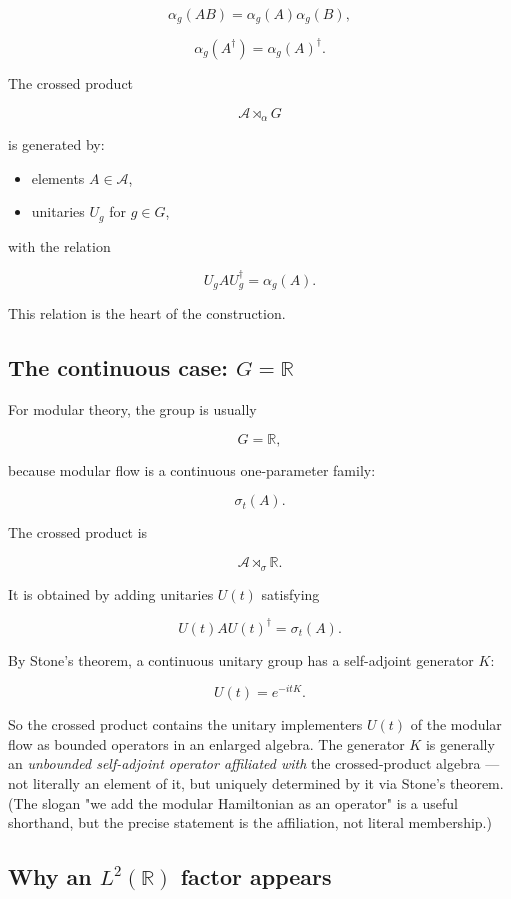 \documentclass[11pt,a4paper]{article}
\begin{document}
\[
\alpha_g(AB)=\alpha_g(A)\alpha_g(B),
\]

\[
\alpha_g(A^\dagger)=\alpha_g(A)^\dagger.
\]

The crossed product

\[
\mathcal{A}\rtimes_\alpha G
\]

is generated by:

\begin{itemize}
  \item elements $A\in\mathcal{A}$,
  \item unitaries $U_g$ for $g\in G$,
\end{itemize}

with the relation

\[
U_g A U_g^\dagger=\alpha_g(A).
\]

This relation is the heart of the construction.

\subsection{The continuous case: $G=\mathbb{R}$}

For modular theory, the group is usually

\[
G=\mathbb{R},
\]

because modular flow is a continuous one-parameter family:

\[
\sigma_t(A).
\]

The crossed product is

\[
\mathcal{A}\rtimes_\sigma \mathbb{R}.
\]

It is obtained by adding unitaries $U(t)$ satisfying

\[
U(t) A U(t)^\dagger = \sigma_t(A).
\]

By Stone’s theorem, a continuous unitary group has a self-adjoint generator $K$:

\[
U(t)=e^{-itK}.
\]

So the crossed product contains the unitary implementers $U(t)$ of the modular flow as bounded operators in an enlarged algebra. The generator $K$ is generally an \emph{unbounded self-adjoint operator affiliated with} the crossed-product algebra — not literally an element of it, but uniquely determined by it via Stone's theorem. (The slogan "we add the modular Hamiltonian as an operator" is a useful shorthand, but the precise statement is the affiliation, not literal membership.)

\subsection{Why an $L^2(\mathbb{R})$ factor appears}
\end{document}
